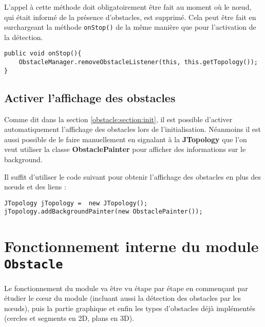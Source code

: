 \documentclass{article}
\newcommand{\obstacle}{{\tt Obstacle}\xspace}
\begin{document}
 L'appel à cette méthode doit obligatoirement être fait au moment où le n\oe ud, qui était informé de la présence d'obstacles, est supprimé. Cela peut être fait en surchargeant la méthode \texttt{onStop()} de la même manière que pour l'activation de la détection.\smallskip
\begin{lstlisting}[frame=single]
public void onStop(){
    ObstacleManager.removeObstacleListener(this, this.getTopology());
}
\end{lstlisting}
\subsection{Activer l'affichage des obstacles}

Comme dit dans la section \ref{obstacle:section:init}, il est possible d'activer automatiquement l'affichage des obstacles lors de l'initialisation.
Néanmoins il est aussi possible de le faire manuellement en signalant à la \textbf{JTopology} que l'on veut utiliser la classe \textbf{ObstaclePainter }pour afficher des informations sur le background.



Il suffit d'utiliser le code suivant pour obtenir l'affichage des obstacles en plus des n\oe uds et des liens :\smallskip
\begin{lstlisting}[frame=single]
JTopology jTopology =  new JTopology();
jTopology.addBackgroundPainter(new ObstaclePainter());
\end{lstlisting}


\section{Fonctionnement interne du module \obstacle}
\label{fonctionnement}
Le fonctionnement du module va être vu étape par étape en commençant par étudier le c\oe ur du module (incluant aussi la détection des obstacles par les n\oe uds), puis la partie graphique et enfin les types d'obstacles déjà implémentés (cercles et segments en 2D, plans en 3D).
\end{document}
